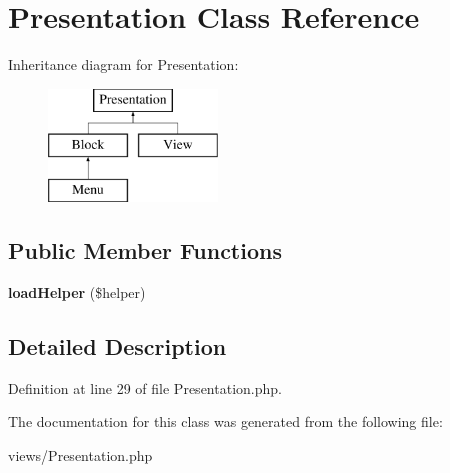 \hypertarget{class_presentation}{
\section{Presentation Class Reference}
\label{class_presentation}
}
Inheritance diagram for Presentation:\begin{figure}[H]
\begin{center}
\leavevmode
\includegraphics[height=3.000000cm]{class_presentation}
\end{center}
\end{figure}
\subsection*{Public Member Functions}
\begin{DoxyCompactItemize}
\item 
\hypertarget{class_presentation_a5e355638029f38ce97469e63b75971ea}{
{\bfseries loadHelper} (\$helper)}
\label{class_presentation_a5e355638029f38ce97469e63b75971ea}

\end{DoxyCompactItemize}


\subsection{Detailed Description}


Definition at line 29 of file Presentation.php.



The documentation for this class was generated from the following file:\begin{DoxyCompactItemize}
\item 
views/Presentation.php\end{DoxyCompactItemize}
